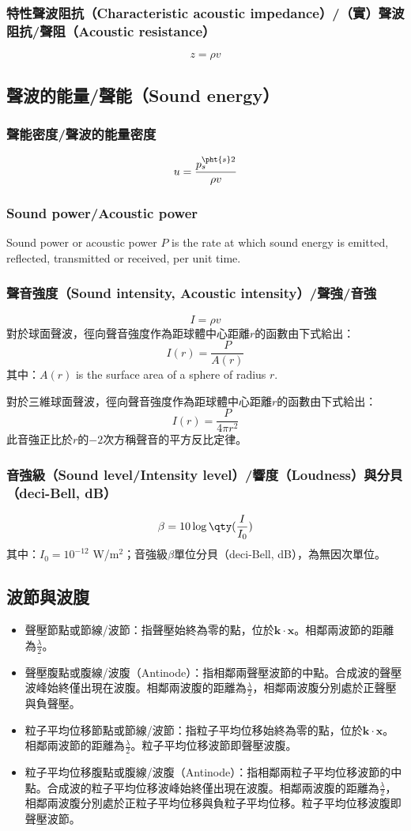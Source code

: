 \documentclass[a4paper,12pt]{report}
\begin{document}
\subsubsection{特性聲波阻抗（Characteristic acoustic impedance）/（實）聲波阻抗/聲阻（Acoustic resistance）}
\[z=\rho v\]
\subsection{聲波的能量/聲能（Sound energy）}
\subsubsection{聲能密度/聲波的能量密度}
\[ u = \frac{p_s^{\pht{s}2}}{\rho v}\]
\subsubsection{Sound power/Acoustic power}
Sound power or acoustic power $P$ is the rate at which sound energy is emitted, reflected, transmitted or received, per unit time.
\subsubsection{聲音強度（Sound intensity, Acoustic intensity）/聲強/音強}
\[ I = \rho v\]
對於球面聲波，徑向聲音強度作為距球體中心距離$r$的函數由下式給出：
\[I(r)=\frac{P}{A(r)}\]
其中：$A(r)$ is the surface area of a sphere of radius $r$.

對於三維球面聲波，徑向聲音強度作為距球體中心距離$r$的函數由下式給出：
\[I(r)=\frac{P}{4\pi r^{2}}\]
此音強正比於$r$的$-2$次方稱聲音的平方反比定律。
\subsubsection{音強級（Sound level/Intensity level）/響度（Loudness）與分貝（deci-Bell, dB）}
\[\beta = 10\log\qty(\frac{I}{I_0})\]
其中：$I_0=10^{-12}$ W/m$^2$；音強級$\beta$單位分貝（deci-Bell, dB），為無因次單位。
\subsection{波節與波腹}
\begin{itemize}
\item 聲壓節點或節線/波節：指聲壓始終為零的點，位於$\mathbf{k}\cdot\mathbf{x}$。相鄰兩波節的距離為$\frac{\lambda}{2}$。
\item 聲壓腹點或腹線/波腹（Antinode）：指相鄰兩聲壓波節的中點。合成波的聲壓波峰始終僅出現在波腹。相鄰兩波腹的距離為$\frac{\lambda}{2}$，相鄰兩波腹分別處於正聲壓與負聲壓。
\item 粒子平均位移節點或節線/波節：指粒子平均位移始終為零的點，位於$\mathbf{k}\cdot\mathbf{x}$。相鄰兩波節的距離為$\frac{\lambda}{2}$。粒子平均位移波節即聲壓波腹。
\item 粒子平均位移腹點或腹線/波腹（Antinode）：指相鄰兩粒子平均位移波節的中點。合成波的粒子平均位移波峰始終僅出現在波腹。相鄰兩波腹的距離為$\frac{\lambda}{2}$，相鄰兩波腹分別處於正粒子平均位移與負粒子平均位移。粒子平均位移波腹即聲壓波節。
\end{itemize}
\end{document}
